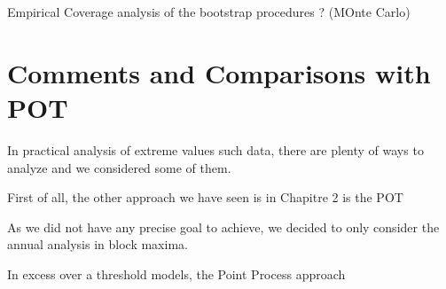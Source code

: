 Empirical Coverage analysis of the bootstrap procedures ? (MOnte Carlo)


 
 
 
\section{Comments and Comparisons with POT}

In practical analysis of extreme values such data, there are plenty of ways to analyze and we considered
some of them.

First of all, the other approach we have seen is in Chapitre 2 is the POT

As we did not have any precise goal to achieve, we decided to only consider the annual analysis in
block maxima.

In excess over a threshold models, the Point Process approach